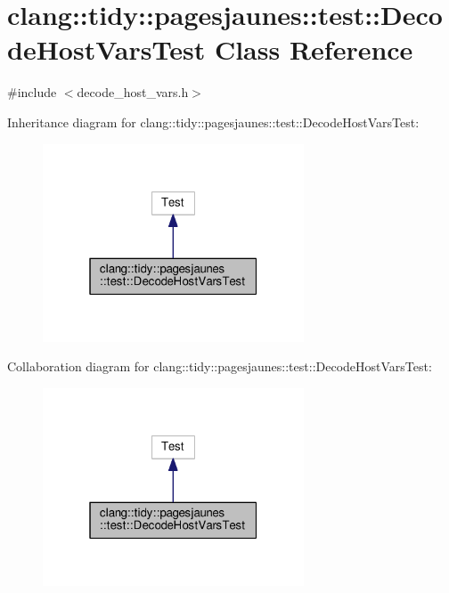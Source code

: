 \hypertarget{classclang_1_1tidy_1_1pagesjaunes_1_1test_1_1_decode_host_vars_test}{}\section{clang\+:\+:tidy\+:\+:pagesjaunes\+:\+:test\+:\+:Decode\+Host\+Vars\+Test Class Reference}
\label{classclang_1_1tidy_1_1pagesjaunes_1_1test_1_1_decode_host_vars_test}


{\ttfamily \#include $<$decode\+\_\+host\+\_\+vars.\+h$>$}



Inheritance diagram for clang\+:\+:tidy\+:\+:pagesjaunes\+:\+:test\+:\+:Decode\+Host\+Vars\+Test\+:
\nopagebreak
\begin{figure}[H]
\begin{center}
\leavevmode
\includegraphics[width=220pt]{classclang_1_1tidy_1_1pagesjaunes_1_1test_1_1_decode_host_vars_test__inherit__graph}
\end{center}
\end{figure}


Collaboration diagram for clang\+:\+:tidy\+:\+:pagesjaunes\+:\+:test\+:\+:Decode\+Host\+Vars\+Test\+:
\nopagebreak
\begin{figure}[H]
\begin{center}
\leavevmode
\includegraphics[width=220pt]{classclang_1_1tidy_1_1pagesjaunes_1_1test_1_1_decode_host_vars_test__coll__graph}
\end{center}
\end{figure}
